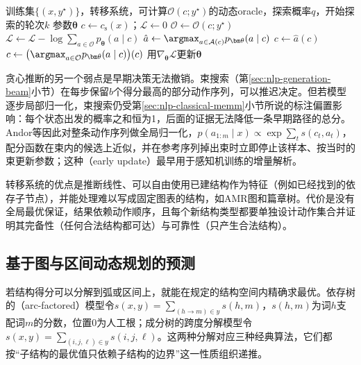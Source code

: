 \begin{algorithm}[基于动态oracle的转移系统训练]
  \label{alg:nlp-analysis-dynamic-oracle}
  \begin{algorithmic}[1]
    \Require 训练集$\{(x,y^\star)\}$，转移系统，可计算$\mathcal O(c;y^\star)$的动态oracle，探索概率$q$，开始探索的轮次$k$
    \Ensure 参数$\bm\theta$
        \State $c\gets c_{\mathrm s}(x)$；$\mathcal L\gets0$
          \State $\mathcal O\gets\mathcal O(c;y^\star)$ 
          \State $\mathcal L\gets\mathcal L-\log\sum_{a\in\mathcal O}p_{\bm\theta}(a\mid c)$
          \State $\hat a\gets\argmax_{a\in\mathcal A(c)}p_{\bm\theta}(a\mid c)$
            \State $c\gets\hat a(c)$ 
          \Else
            \State $c\gets\bigl(\argmax_{a\in\mathcal O}p_{\bm\theta}(a\mid c)\bigr)(c)$
          \EndIf
        \EndWhile
        \State 用$\nabla_{\bm\theta}\mathcal L$更新$\bm\theta$
      \EndFor
    \EndFor
  \end{algorithmic}
\end{algorithm}

贪心推断的另一个弱点是早期决策无法撤销。束搜索（第\ref{sec:nlp-generation-beam}小节）在每步保留$b$个得分最高的部分动作序列，可以推迟决定。但若模型逐步局部归一化，束搜索仍受第\ref{sec:nlp-classical-memm}小节所说的标注偏置影响：每个状态出发的概率之和恒为1，后面的证据无法降低一条早期路径的总分。Andor等因此对整条动作序列做全局归一化，$p(a_{1:m}\mid x)\propto\exp\sum_t s(c_t,a_t)$，配分函数在束内的候选上近似，并在参考序列掉出束时立即停止该样本、按当时的束更新参数；这种（early update）最早用于感知机训练的增量解析。

转移系统的优点是推断线性、可以自由使用已建结构作为特征（例如已经找到的依存子节点），并能处理难以写成固定图表的结构，如AMR图和篇章树。代价是没有全局最优保证，结果依赖动作顺序，且每个新结构类型都要单独设计动作集合并证明其完备性（任何合法结构都可达）与可靠性（只产生合法结构）。

\subsection{基于图与区间动态规划的预测}
\label{sec:nlp-analysis-paradigm-graph}

若结构得分可以分解到弧或区间上，就能在规定的结构空间内精确求最优。依存树的（arc-factored）模型令$s(x,y)=\sum_{(h\to m)\in y}s(h,m)$，$s(h,m)$为词$h$支配词$m$的分数，位置0为人工根；成分树的跨度分解模型令$s(x,y)=\sum_{(i,j,\ell)\in y}s(i,j,\ell)$。这两种分解对应三种经典算法，它们都按“子结构的最优值只依赖子结构的边界”这一性质组织递推。

